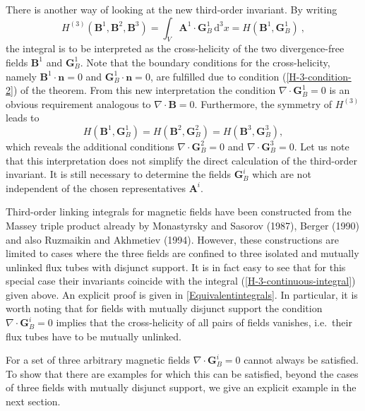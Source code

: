 \documentclass[10pt]{iopart}
\def \d{\mbox{d}}
\def \dxxx{\,\d^{3}\!x}
\def \bA{{\mathbf{A}}}
\def \bB{{\mathbf{B}}}
\def \bG{{\mathbf{G}}}
\def \bn{{\mathbf{n}}}
\begin{document}
There is 
another way of looking at the new third-order invariant.
By writing
\begin{equation}
   H^{(3)}(\bB^1,\bB^2,\bB^3) = \int_{V} \bA^1\cdot\bG_B^1
   \dxxx = H(\bB^1, \bG_B^1) \ ,
\end{equation}
the integral 
is to be interpreted as 
the cross-helicity of the two divergence-free fields
$\bB^1$ and $\bG_B^1$.
Note that the boundary conditions for the cross-helicity, namely
$\bB^1\cdot\bn=0$ and $\bG_B^1\cdot\bn=0$, are fulfilled due to
condition (\ref{H-3-condition-2}) of the theorem.
From this new interpretation the condition
$\nabla\cdot\bG_B^1=0$ is an obvious requirement 
analogous to $\nabla\cdot\bB=0$.
Furthermore, the symmetry of $H^{(3)}$ leads to 
\begin{equation}
   H(\bB^1, \bG_B^1) = H(\bB^2, \bG_B^2) = H(\bB^3, \bG_B^3),
   \label{H-3-cross-helicity}
\end{equation}
which reveals the additional conditions
$\nabla\cdot\bG_B^2=0$ and $\nabla\cdot\bG_B^3=0$.
Let us note that 
this interpretation does not simplify the direct 
calculation of the third-order invariant.
It is still necessary
to determine the fields $\bG_B^i$
which are not independent of
the chosen representatives $\bA^i$.


Third-order linking integrals for magnetic fields 
have been constructed from the Massey
triple product already by Monastyrsky and Sasorov (1987), Berger (1990)
and also Ruzmaikin and Akhmetiev (1994). However,
these constructions are limited to cases where the three fields
are confined to three isolated and mutually unlinked flux tubes with
disjunct support.
It is in fact easy to
see that for this special case their invariants coincide with the integral
(\ref{H-3-continuous-integral}) given above.
An explicit proof is given in \ref{Equivalentintegrals}.
In particular, it is worth noting that for fields with
mutually disjunct support the condition $\nabla\cdot \bG^i_B=0$ implies that
the cross-helicity of all pairs of fields vanishes, i.e.~their flux tubes
have to be mutually unlinked.

For a set of three arbitrary magnetic fields $\nabla\cdot \bG^i_B=0$ cannot
always be satisfied.
To show that there are examples
for which this can be satisfied,
beyond the cases of three fields with mutually disjunct
support,
we give an explicit example in the next section.


\end{document}
